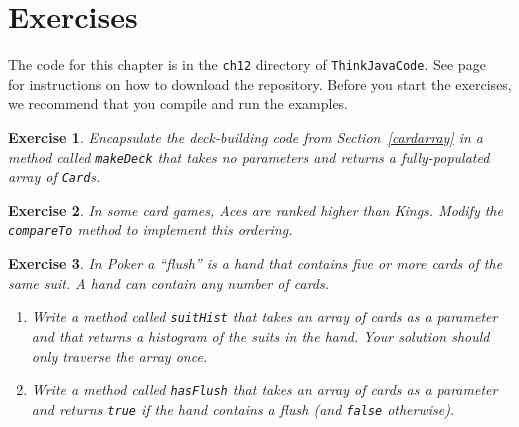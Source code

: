 \documentclass[12pt]{book}
\theoremstyle{exercise}
\newtheorem{exercise}{Exercise}[chapter]
\newcommand{\java}[1]{\verb"#1"}
\begin{document}
\section{Exercises}

The code for this chapter is in the {\tt ch12} directory of {\tt ThinkJavaCode}.
See page~\pageref{code} for instructions on how to download the repository.
Before you start the exercises, we recommend that you compile and run the examples.



\begin{exercise}
Encapsulate the deck-building code from Section~\ref{cardarray} in a method called \java{makeDeck} that takes no parameters and returns a fully-populated array of \java{Card}s.
\end{exercise}


\begin{exercise}
In some card games, Aces are ranked higher than Kings.
Modify the \java{compareTo} method to implement this ordering.
\end{exercise}





\begin{exercise}
In Poker a ``flush'' is a hand that contains five or more cards of the same suit.
A hand can contain any number of cards.



\begin{enumerate}

\item Write a method called \java{suitHist} that takes an array of cards as a parameter and that returns a histogram of the suits in the hand.
Your solution should only traverse the array once.

\item Write a method called \java{hasFlush} that takes an array of cards as a parameter and returns \java{true} if the hand contains a flush (and \java{false} otherwise).

\end{enumerate}

\end{exercise}
\end{document}
